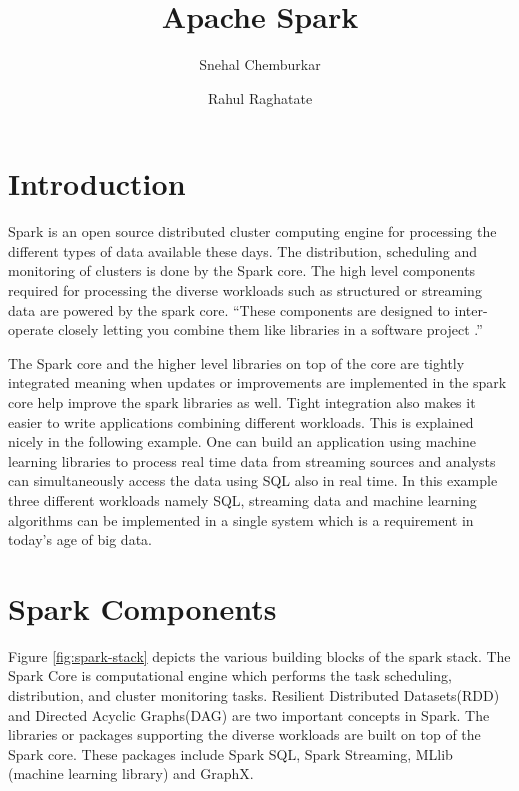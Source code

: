 \documentclass[9pt,twocolumn,twoside]{../../styles/osajnl}
\title{Apache Spark}
\author[1]{Snehal Chemburkar}
\author[1]{Rahul Raghatate}
\affil[1]{School of Informatics and Computing, Bloomington, IN 47408, U.S.A.}
\affil[*]{Corresponding authors: snehchem@iu.edu, rraghtate@iu.edu}
\begin{document}
\maketitle

\section{Introduction}

Spark is an open source distributed cluster computing engine for
processing the different types of data available these days. The
distribution, scheduling and monitoring of clusters is done by the
Spark core. The high level components required for processing the diverse workloads such as structured or streaming data are powered by the spark core. “These components are designed to inter-operate closely letting
you combine them like libraries in a software project \cite{book-spark}.”

The Spark core and the higher level libraries on top of the core are
tightly integrated meaning when updates or improvements are
implemented in the spark core help improve the spark libraries as
well. Tight integration also makes it easier to write applications
combining different workloads. This is explained nicely in the
following example. One can build an application using machine learning
libraries to process real time data from streaming sources and
analysts can simultaneously access the data using SQL also in real
time.  In this example three different workloads namely SQL, streaming
data and machine learning algorithms can be implemented in a single
system which is a requirement in today’s age of big data.

\section{Spark Components}

Figure \ref{fig:spark-stack} depicts the various building blocks of
the spark stack. The Spark Core is computational engine which performs the task scheduling, distribution, and cluster monitoring tasks. Resilient Distributed Datasets(RDD) \cite{paper-RDD} and Directed Acyclic Graphs(DAG) are two important concepts in Spark. The libraries or packages supporting the diverse workloads are built on top of the Spark core. These packages include Spark SQL, Spark Streaming, MLlib (machine learning library) and GraphX.
\end{document}
